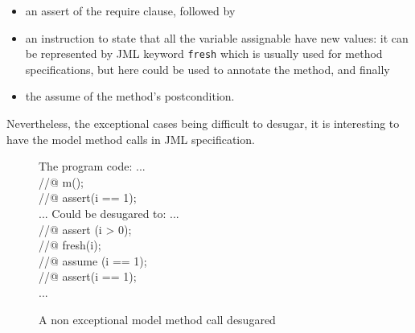 \begin{itemize} 
\item 
an assert of the require clause, followed by
\item 
an instruction to state that all the variable assignable have new
values: it can be represented by JML keyword {\tt fresh} which is
usually used for method specifications, but here could be used to
annotate the method, and finally
\item the assume of the method's postcondition.
\end{itemize}
Nevertheless, the exceptional cases being difficult to desugar, it is
interesting to have the model method calls in JML specification.

\begin{figure}
\begin{center}\begin{minipage}{4cm}
The program code:
\bcode
...\\
//@ m();\\
//@ assert(i == 1);\\
...
\ecode
Could be desugared to:
\bcode
...\\
//@ assert (i > 0);\\
//@ fresh(i);\\
//@ assume (i == 1);\\
//@ assert(i == 1);\\
...
\ecode
\end{minipage}\end{center}
\caption{A non exceptional model method call desugared}
\label{model_meth}
\end{figure}
